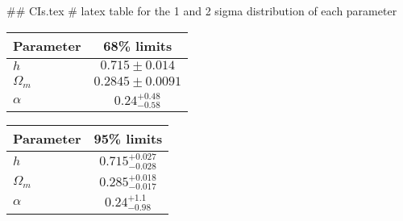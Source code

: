 ## CIs.tex
# latex table for the 1 and 2 sigma distribution of each parameter

\begin{tabular} { l  c}
 Parameter &  68\% limits\\
\hline
{\boldmath$h              $} & $0.715\pm 0.014            $\\
{\boldmath$\Omega_m       $} & $0.2845\pm 0.0091          $\\
{\boldmath$\alpha         $} & $0.24^{+0.48}_{-0.58}      $\\
\hline
\end{tabular}

\begin{tabular} { l  c}
 Parameter &  95\% limits\\
\hline
{\boldmath$h              $} & $0.715^{+0.027}_{-0.028}   $\\
{\boldmath$\Omega_m       $} & $0.285^{+0.018}_{-0.017}   $\\
{\boldmath$\alpha         $} & $0.24^{+1.1}_{-0.98}       $\\
\hline
\end{tabular}

